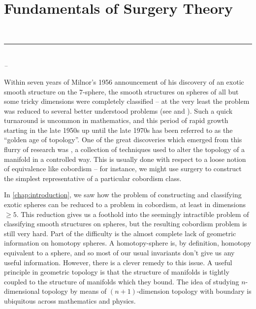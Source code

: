 \chapter{Fundamentals of Surgery Theory}\label{chap:construction}

\begin{flushleft}
	\textsl{}\\
	\rule[0pt]{15em}{0.5pt}\\
	\textsl{-- }
	\vspace{2em}
\end{flushleft}

Within seven years of Milnor's 1956 announcement \cite{milnor1956manifolds} of his discovery of an exotic smooth structure on the $7$-sphere, the smooth structures on spheres of all but some tricky dimensions were completely classified  -- at the very least the problem was reduced to several better understood problems (see \cite{milnor1960homotopyspheres} and \cite{milnor1963groups}).
Such a quick turnaround is uncommon in mathematics, and this period of rapid growth starting in the late 1950s up until the late 1970s has been referred to as the ``golden age of topology''.
One of the great discoveries which emerged from this flurry of research was , a collection of techniques used to alter the topology of a manifold in a controlled way. This is usually done with respect to a loose notion of equivalence like cobordism -- for instance, we might use surgery to construct the simplest representative of a particular cobordism class.

In \cref{chap:introduction}, we saw how the problem of constructing and classifying exotic spheres can be reduced to a problem in cobordism, at least in dimensions $\geq 5$. This reduction gives us a foothold into the seemingly intractible problem of classifying smooth structures on spheres, but the resulting cobordism problem is still very hard.
Part of the difficulty is the almost complete lack of geometric information on homotopy spheres. A homotopy-sphere is, by definition, homotopy equivalent to a sphere, and so most of our usual invariants don't give us any useful information. However, there is a clever remedy to this issue. A useful principle in geometric topology is that the structure of manifolds is tightly coupled to the structure of manifolds which they bound.  The idea of studying $n$-dimensional topology by means of $(n+1)$-dimension topology with boundary is ubiquitous across mathematics and physics. 

